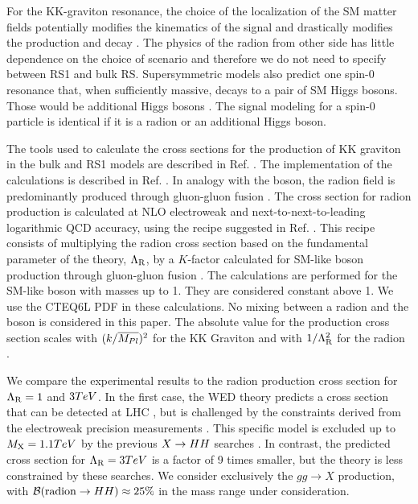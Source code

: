 For the KK-graviton resonance, the choice of the localization of the SM matter fields potentially modifies the kinematics  
of the signal and drastically modifies the production and decay \cite{Oliveira:2010uv}. 
The physics of the radion from other side has little dependence on the choice of scenario \cite{Giudice:2000av} and therefore we do not need to specify between RS1 and bulk RS. 
Supersymmetric models also  predict one spin-0 resonance that, when sufficiently massive, decays to a pair of SM Higgs bosons. Those would be additional Higgs bosons \cite{Djouadi:2005gj,Barbieri:2013nka}. The signal modeling for a spin-0 particle is identical if it is a radion or an additional Higgs boson.


The tools used to calculate the cross sections for the production of KK graviton in the bulk and RS1 models are described in Ref. \cite{Agashe:2013kyb, deAquino:2011ix}. The implementation of the calculations is described in Ref. \cite{Oliveira:2014kla}.   
In analogy with the \PH boson, the radion field is predominantly produced through gluon-gluon fusion \cite{Mahanta:2000zp, Davoudiasl:2000wi}. 
The cross section for radion production is calculated  at NLO electroweak and next-to-next-to-leading logarithmic QCD 
accuracy, using the recipe suggested in Ref. \cite{Giudice:2000av}. This recipe consists of multiplying the radion cross section based on the 
fundamental parameter of the theory, $\Lambda_{\rm R}$, by a $K$-factor calculated for SM-like \PH boson 
production through gluon-gluon fusion \cite{Catani:2003zt,Heinemeyer:2013tqa}. The calculations are performed for the SM-like \PH boson with masses up to 1\TeV. They are considered constant above 1\TeV. We use the CTEQ6L PDF \cite{Nadolsky:2008zw} in these calculations. No mixing between a radion and the \PH boson is considered in this paper. The absolute value for the production cross section scales with $(k/\overline{M_{Pl}})^2$ for the KK Graviton \cite{Oliveira:2010uv} and with $1/\Lambda_{\rm R}^2$ for the radion \cite{Barger:2011qn}.

We compare the experimental results to the radion production cross section for $\Lambda_{\rm R} = 1$ and $3TeV$. In the first case, the WED theory predicts a cross section that can be detected at LHC \cite{Khachatryan:2015year}, but is challenged by the constraints derived from the electroweak precision measurements \cite{Archer:2014jca}. This specific model is excluded up to $M_{\rm X} = 1.1TeV$ by the previous $X \to HH$ searches \cite{Aad:2015uka, Khachatryan:2015year}. In contrast, the predicted cross section for $\Lambda_{\rm R}=3 TeV$ is a factor of 9 times smaller, but the theory is less constrained by these searches. We consider exclusively the $gg \to X$ production, with $\mathcal{B}({\rm radion} \to HH) \approx 25\%$ in the mass range under consideration. 

